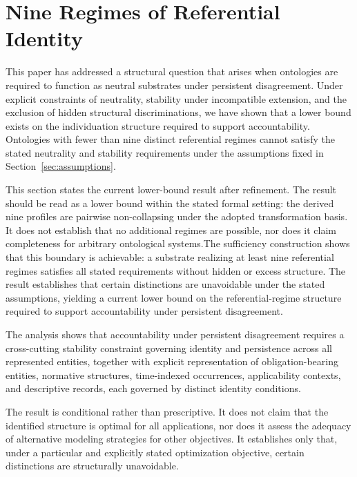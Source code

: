 
\section{Nine Regimes of Referential Identity}
\label{sec:nine}

This paper has addressed a structural question that arises when ontologies
are required to function as neutral substrates under persistent
disagreement.
Under explicit constraints of neutrality, stability under incompatible extension,
and the exclusion of hidden structural discriminations, we have
shown that a lower bound exists on the individuation structure
required to support accountability.
Ontologies with fewer than nine distinct referential regimes
cannot satisfy the stated neutrality and stability requirements
under the assumptions fixed in Section~\ref{sec:assumptions}.

This section states the current lower-bound result after refinement.
The result should be read as a lower bound within the stated formal setting:
the derived nine profiles are pairwise non-collapsing under the adopted
transformation basis.
It does not establish that no additional regimes are possible,
nor does it claim completeness for arbitrary ontological systems.The sufficiency construction shows that this boundary is achievable:
a substrate realizing at least nine referential regimes
satisfies all stated requirements without hidden or excess structure.
The result establishes that certain distinctions are unavoidable
under the stated assumptions, yielding a current lower bound on the
referential-regime structure required to support accountability under
persistent disagreement.

The analysis shows that accountability under persistent disagreement
requires a cross-cutting stability constraint governing identity and
persistence across all represented entities,
together with explicit representation of obligation-bearing entities, normative structures,
time-indexed occurrences, applicability contexts, and descriptive records,
each governed by distinct identity conditions.

The result is conditional rather than prescriptive.
It does not claim that the identified structure
is optimal for all applications,
nor does it assess the adequacy of
alternative modeling strategies for other objectives.
It establishes only that, under a particular and explicitly stated
optimization objective, certain distinctions are structurally unavoidable.

